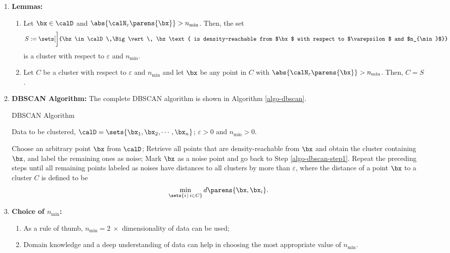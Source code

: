 \documentclass[12pt]{article}
\begin{document}
\begin{enumerate}[label=\textbf{\arabic*.}]
	\item \textbf{Lemmas:}
	\begin{enumerate}
		\item Let $\bx \in \calD$ and $\abs{\calN_{\varepsilon} \parens{\bx}} > n_{\min}$. Then, the set 
		\begin{align*}
			S := \sets[\bigg]{\bz \in \calD \,\Big\vert\, \bz \text{ is density-reachable from $\bx$ with respect to $\varepsilon$ and $n_{\min}$}}
		\end{align*}
		is a cluster with respect to $\varepsilon$ and $n_{\min}$. 
		
		\item Let $C$ be a cluster with respect to $\varepsilon$ and $n_{\min}$ and let $\bx$ be any point in $C$ with $\abs{\calN_{\varepsilon} \parens{\bx}} > n_{\min}$. Then, $C = S$. 
	\end{enumerate}
	
	\item \textbf{DBSCAN Algorithm:} The complete DBSCAN algorithm is shown in Algorithm \ref{algo-dbscan}. 
	
	\begin{minipage}{\linewidth}
	\begin{algorithm}[H]
		\caption{DBSCAN Algorithm}\label{algo-dbscan}
		\begin{algorithmic}[1]
			\REQUIRE Data to be clustered, $\calD = \sets{\bx_1, \bx_2, \cdots, \bx_n}$; 
			\REQUIRE $\varepsilon > 0$ and $n_{\min} > 0$. 
			
			\STATE \label{algo-dbscan-step1} Choose an arbitrary point $\bx$ from $\calD$; 
			\STATE Retrieve all points that are density-reachable from $\bx$ and obtain the cluster containing $\bx$, and label the remaining ones as noise; 
			\ELSE 
			\STATE Mark $\bx$ as a noise point and go back to Step \ref{algo-dbscan-step1}. 
			\ENDIF
			\STATE Repeat the preceding steps until all remaining points labeled as noises have distances to all clusters by more than $\varepsilon$, where the distance of a point $\bx$ to a cluster $C$ is defined to be 
			\begin{align*}
				\min_{\sets{i \,\vert\, i \in C}} d \parens{\bx, \bx_i}. 
			\end{align*}
		\end{algorithmic}
	\end{algorithm}
	\end{minipage}
	
	\item \textbf{Choice of $n_{\min}$:} 
	\begin{enumerate}
		\item As a rule of thumb, $n_{\min} = 2 \ \times$ dimensionality of data can be used; 
		\item Domain knowledge and a deep understanding of data can help in choosing the most appropriate value of $n_{\min}$. 
	\end{enumerate}
	

\end{enumerate}
\end{document}

